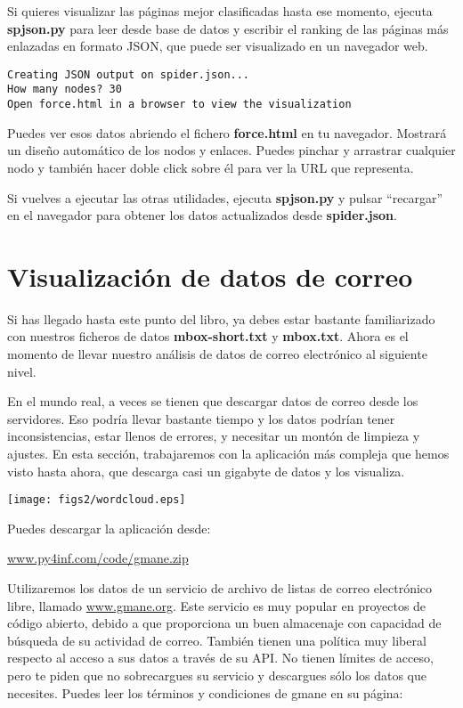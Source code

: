 Si quieres visualizar las páginas mejor clasificadas hasta ese momento,
ejecuta {\bf spjson.py} para leer desde base de datos y escribir el ranking de
las páginas más enlazadas en formato JSON, que puede ser visualizado en
un navegador web.

\beforeverb
\begin{verbatim}
Creating JSON output on spider.json...
How many nodes? 30
Open force.html in a browser to view the visualization
\end{verbatim}
\afterverb
%
Puedes ver esos datos abriendo el fichero {\bf force.html} en tu navegador.
Mostrará un diseño automático de los nodos y enlaces. Puedes pinchar y
arrastrar cualquier nodo y también hacer doble click sobre él para ver la URL
que representa.

Si vuelves a ejecutar las otras utilidades, ejecuta {\bf spjson.py} y
pulsar ``recargar'' en el navegador para obtener los datos actualizados desde {\bf spider.json}.

\section{Visualización de datos de correo}

Si has llegado hasta este punto del libro, ya debes estar bastante familiarizado con
nuestros ficheros de datos {\bf mbox-short.txt} y {\bf mbox.txt}. Ahora es el momento
de llevar nuestro análisis de datos de correo electrónico al siguiente nivel.

En el mundo real, a veces se tienen que descargar datos de correo desde los servidores.
Eso podría llevar bastante tiempo y los datos podrían tener inconsistencias,
estar llenos de errores, y necesitar un montón de limpieza y ajustes. En esta sección,
trabajaremos con la aplicación más compleja que hemos visto hasta ahora, que
descarga casi un gigabyte de datos y los visualiza.

\beforefig
\centerline{\texttt{[image: figs2/wordcloud.eps]}}
\afterfig

Puedes descargar la aplicación desde:

\url{www.py4inf.com/code/gmane.zip}

Utilizaremos los datos de un servicio de archivo de listas de correo electrónico libre,
llamado \url{www.gmane.org}. Este servicio es muy popular en proyectos de código abierto,
debido a que proporciona un buen almacenaje con capacidad de búsqueda de su
actividad de correo. También tienen una política muy liberal respecto al acceso a
sus datos a través de su API. No tienen límites de acceso, pero te piden que no
sobrecargues su servicio y descargues sólo los datos que necesites. Puedes leer
los términos y condiciones de gmane en su página:

